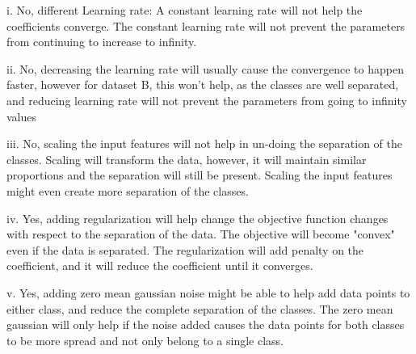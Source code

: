 \begin{answer}

i. No, different Learning rate: A constant learning rate will not help the coefficients converge. The constant learning rate will not prevent the parameters from continuing to increase to infinity. 

ii. No, decreasing the learning rate will usually cause the convergence to happen faster, however for dataset B, this won't help, as the classes are well separated, and reducing learning rate will not prevent the parameters from going to infinity values

iii. No, scaling the input features will not help in un-doing the separation of the classes. Scaling will transform the data, however, it will maintain similar proportions and the separation will still be present. Scaling the input features might even create more separation of the classes.

iv. Yes, adding regularization will help change the objective function changes with respect to the separation of the data. The objective will become "convex" even if the data is separated. The regularization will add penalty on the coefficient, and it will reduce the coefficient until it converges.

v.  Yes, adding zero mean gaussian noise might be able to help add data points to either class, and reduce the complete separation of the classes. The zero mean gaussian will only help if the noise added causes the data points for both classes to be more spread and not only belong to a single class.
\end{answer}
